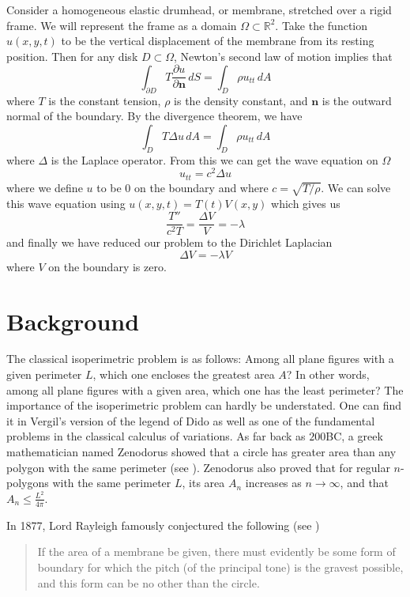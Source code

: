 \documentclass[12pt]{report}
\numberwithin{definition}{section}
\begin{document}
Consider a homogeneous elastic drumhead, or membrane, stretched over a rigid frame.
We will represent the frame as a domain $\Omega \subset \mathbb{R}^{2}$.
Take the function $u(x,y,t)$ to be the vertical displacement of the membrane from its resting position.
Then for any disk $D \subset \Omega$, Newton's second law of motion implies that
$$ \int_{\partial D} T \frac{\partial u}{\partial \textbf{n}} \, dS = \int_{ D} \rho u_{tt} \, dA $$
where $T$ is the constant tension, $\rho$ is the density constant, and $\textbf{n}$ is the outward normal of the boundary.
By the divergence theorem, we have
$$ \int_{D} T \Delta u \, dA = \int_{D} \rho u_{tt} \, dA $$
where $\Delta$ is the Laplace operator.
From this we can get the wave equation on $\Omega$
$$ u_{tt} = c^{2} \Delta u $$
where we define $u$ to be $0$ on the boundary and where $c = \sqrt{T / \rho}$.
We can solve this wave equation using $u(x,y,t) = T(t)V(x,y)$ which gives us
$$ \frac{T''}{c^{2}T} = \frac{\Delta V}{V} = - \lambda $$
and finally we have reduced our problem to the Dirichlet Laplacian
$$ \Delta V = - \lambda V $$
where $V$ on the boundary is zero.

\break


\section{Background}
The classical isoperimetric problem is as follows: Among all plane figures with a given perimeter $L$, which one encloses the greatest area $A$?
In other words, among all plane figures with a given area, which one has the least perimeter?
The importance of the isoperimetric problem can hardly be understated.
One can find it in Vergil's version of the legend of Dido as well as one of the fundamental problems in the classical calculus of variations.
As far back as $200$BC, a greek mathematician named Zenodorus showed that a circle has greater area than any polygon with the same perimeter (see \cite{pappus}).
Zenodorus also proved that for regular $n $-polygons with the same perimeter $L$, its area $A_{n}$ increases as $n \to \infty$, and that $A_{n} \leq \frac{L^{2}}{4\pi}$.

In 1877, Lord Rayleigh famously conjectured the following (see \cite{rayleigh})

\begin{quote}
If the area of a membrane be given, there must evidently be some
form of boundary for which the pitch (of the principal tone) is the
gravest possible, and this form can be no other than the circle.
\end{quote}
\end{document}
